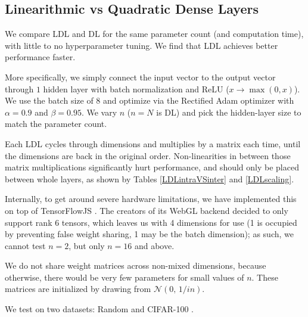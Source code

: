 \documentclass{article}
\begin{document}
\subsection{Linearithmic vs Quadratic Dense Layers}

We compare LDL and DL for the same parameter count (and computation time), with little to no hyperparameter tuning. We find that LDL achieves better performance faster.

More specifically, we simply connect the input vector to the output vector through $1$ hidden layer with batch normalization \cite{ioffe2015batch} and ReLU ($x \rightarrow \max(0,x)$). We use the batch size of $8$ and optimize via the Rectified Adam optimizer \cite{liu2019radam} with $\alpha=0.9$ and $\beta=0.95$. We vary $n$ ($n=N$ is DL) and pick the hidden-layer size to match the parameter count.

Each LDL cycles through dimensions and multiplies by a matrix each time, until the dimensions are back in the original order. Non-linearities in between those matrix multiplications significantly hurt performance, and should only be placed between whole layers, as shown by Tables \ref{LDLintraVSinter} and \ref{LDLscaling}.

Internally, to get around severe hardware limitations, we have implemented this on top of TensorFlowJS \cite{tensorflow2015-whitepaper}. The creators of its WebGL backend decided to only support rank $6$ tensors, which leaves us with 4 dimensions for use (1 is occupied by preventing false weight sharing, 1 may be the batch dimension); as such, we cannot test $n=2$, but only $n=16$ and above.

We do not share weight matrices across non-mixed dimensions, because otherwise, there would be very few parameters for small values of $n$. These matrices are initialized by drawing from $\mathcal{N}(0,\,1/in)$.

We test on two datasets: Random and CIFAR-100 \cite{Krizhevsky09learningmultiple}.
\end{document}
